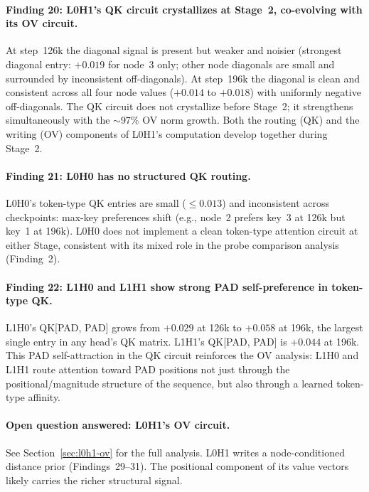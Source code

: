 \documentclass[11pt, a4paper]{article}
\begin{document}
\paragraph{Finding 20: L0H1's QK circuit crystallizes at Stage~2, co-evolving
with its OV circuit.}
At step~126k the diagonal signal is present but weaker and noisier (strongest
diagonal entry: $+0.019$ for node~3 only; other node diagonals are small and
surrounded by inconsistent off-diagonals).  At step~196k the diagonal is clean
and consistent across all four node values ($+0.014$ to $+0.018$) with
uniformly negative off-diagonals.  The QK circuit does not crystallize before
Stage~2; it strengthens simultaneously with the $\sim$97\% OV norm growth.
Both the routing (QK) and the writing (OV) components of L0H1's computation
develop together during Stage~2.

\paragraph{Finding 21: L0H0 has no structured QK routing.}
L0H0's token-type QK entries are small ($\le 0.013$) and inconsistent across
checkpoints: max-key preferences shift (e.g., node~2 prefers key~3 at 126k
but key~1 at 196k).  L0H0 does not implement a clean token-type attention
circuit at either Stage, consistent with its mixed role in the probe
comparison analysis (Finding~2).

\paragraph{Finding 22: L1H0 and L1H1 show strong PAD self-preference in
token-type QK.}
L1H0's QK[PAD, PAD] grows from $+0.029$ at 126k to $+0.058$ at 196k, the
largest single entry in any head's QK matrix.  L1H1's QK[PAD, PAD] is $+0.044$
at 196k.  This PAD self-attraction in the QK circuit reinforces the OV
analysis: L1H0 and L1H1 route attention toward PAD positions not just through
the positional/magnitude structure of the sequence, but also through a learned
token-type affinity.

\paragraph{Open question answered: L0H1's OV circuit.}
See Section~\ref{sec:l0h1-ov} for the full analysis.  L0H1 writes a
node-conditioned distance prior (Findings~29--31).  The positional component
of its value vectors likely carries the richer structural signal.
\end{document}
